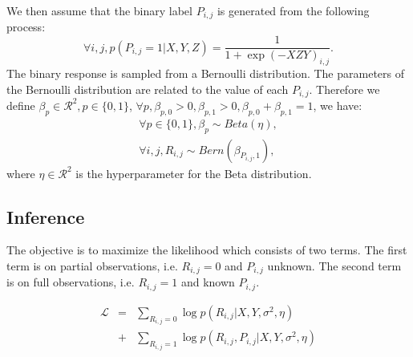 \documentclass[conference]{IEEEtran}
\begin{document}
We then assume that the binary label $P_{i,j}$ is generated from the following process:
\begin{equation}\label{equ:p}
\forall i,j, p(P_{i,j}=1|X,Y,Z)=\frac{1}{1+\exp{(-XZY)}_{i,j}}.
\end{equation}
The binary response is sampled from a Bernoulli distribution. The parameters of the Bernoulli distribution are related to the value of each $P_{i,j}$. Therefore we define $\beta_p\in\mathcal{R}^{2},p\in \{0,1\}$, $\forall p, \beta_{p,0}>0,\beta_{p,1}>0,\beta_{p,0}+\beta_{p,1}=1$, we have:
\begin{eqnarray}\label{equ:q}
\forall p\in \{0,1\}, \beta_p \sim Beta(\eta),\\
\forall i,j, R_{i,j} \sim Bern (\beta_{P_{i,j},1}),
\end{eqnarray}
where $\eta\in\mathcal{R}^{2}$ is the hyperparameter for the Beta distribution.

\subsection{Inference}\label{sec:inference}
The objective is to maximize the likelihood which consists of two terms. The first term is on partial observations, i.e. $R_{i,j}=0$ and $P_{i,j}$ unknown. The second term is on full observations, i.e. $R_{i,j}=1$ and known $P_{i,j}$.

\begin{eqnarray}\label{equ:loss}
\mathcal{L}&=&\sum_{R_{i,j}=0} \log p(R_{i,j}|X,Y,\sigma^2,\eta) \nonumber\\
&+& \sum_{R_{i,j}=1} \log p(R_{i,j},P_{i,j}|X,Y,\sigma^2,\eta)
\end{eqnarray}
\end{document}
